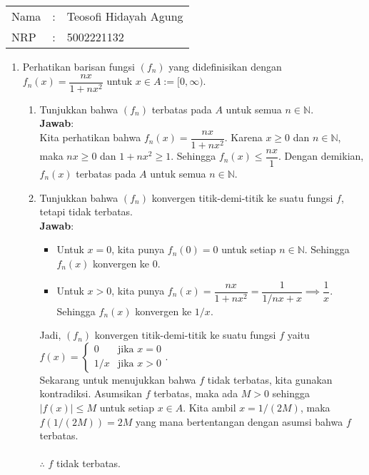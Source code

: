 \documentclass{article}
\newcommand{\jawab}{\textbf{Jawab}:}
\newcommand{\N}{\mathbb{N}}
\begin{document}
    \begin{tabular}{|lcl|}
     \hline
     Nama&:&Teosofi Hidayah Agung\\
     NRP&:&5002221132\\
     \hline
    \end{tabular}
    \begin{enumerate}
        \item Perhatikan barisan fungsi $(f_n)$ yang didefinisikan dengan $f_n(x)=\dfrac{nx}{1+nx^2}$ untuk $x\in A:=[0,\infty)$.
        \begin{enumerate}
            \item Tunjukkan bahwa $(f_n)$ terbatas pada $A$ untuk semua $n\in\N$.\\
            \jawab\\
            Kita perhatikan bahwa $f_n(x)=\dfrac{nx}{1+nx^2}$. Karena $x\geq 0$ dan $n\in\N$, 
            maka $nx\geq 0$ dan $1+nx^2\geq 1$. Sehingga $f_n(x)\leq \dfrac{nx}{1}$. Dengan 
            demikian, $f_n(x)$ terbatas pada $A$ untuk semua $n\in\N$.
            
            \item Tunjukkan bahwa $(f_n)$ konvergen titik-demi-titik ke suatu fungsi $f$, tetapi tidak terbatas.\\
            \jawab
            \begin{itemize}
                \item Untuk $x=0$, kita punya $f_n(0)=0$ untuk setiap $n\in\N$. Sehingga $f_n(x)$ konvergen ke $0$.
                \item Untuk $x>0$, kita punya $f_n(x)=\dfrac{nx}{1+nx^2}=\dfrac{1}{1/nx+x}\implies\dfrac{1}{x}$. 
                Sehingga $f_n(x)$ konvergen ke $1/x$.
            \end{itemize}
            Jadi, $(f_n)$ konvergen titik-demi-titik ke suatu fungsi $f$ yaitu $f(x)=\begin{cases}0&\text{jika }x=0\\1/x&\text{jika }x>0\end{cases}$.\\
            Sekarang untuk menujukkan bahwa $f$ tidak terbatas, kita gunakan kontradiksi. 
            Asumsikan $f$ terbatas, maka ada $M>0$ sehingga $|f(x)|\leq M$ untuk setiap $x\in A$. 
            Kita ambil $x=1/(2M)$, maka $f(1/(2M))=2M$ yang mana bertentangan dengan asumsi bahwa $f$ terbatas.\\\\
            $\therefore$ $f$ tidak terbatas.\\


\end{enumerate}
\end{enumerate}
\end{document}
